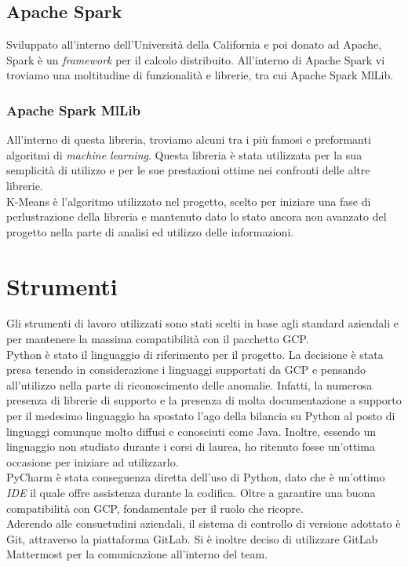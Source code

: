 \subsection{Apache Spark}
Sviluppato all'interno dell'Università della California e poi donato ad Apache, Spark è un \emph{framework} per il calcolo distribuito. 
All'interno di Apache Spark vi troviamo una moltitudine di funzionalità e librerie, tra cui Apache Spark MlLib.
\subsubsection{Apache Spark MlLib}
All'interno di questa libreria, troviamo alcuni tra i più famosi e preformanti algoritmi di \emph{machine learning}. Questa libreria è stata utilizzata per la sua semplicità di utilizzo e per le sue prestazioni ottime nei confronti delle altre librerie.
\\
K-Means \cite{k-means} è  l'algoritmo utilizzato nel progetto, scelto per iniziare una fase di perlustrazione della libreria e mantenuto dato lo stato ancora non avanzato del progetto nella parte di analisi ed utilizzo delle informazioni.
\section{Strumenti}
Gli strumenti di lavoro utilizzati sono stati scelti in base agli standard aziendali e per mantenere la massima compatibilità con il pacchetto GCP.
\\
Python è stato il linguaggio di riferimento per il progetto. La decisione è stata presa tenendo in considerazione i linguaggi supportati da GCP e pensando all'utilizzo nella parte di riconoscimento delle anomalie. Infatti, la numerosa presenza di librerie di supporto e la presenza di molta documentazione a supporto per il medesimo linguaggio ha spostato l'ago della bilancia su Python al posto di linguaggi comunque molto diffusi e conosciuti come Java. Inoltre, essendo un linguaggio non studiato durante i corsi di laurea, ho ritenuto fosse un'ottima occasione per iniziare ad utilizzarlo.
\\
PyCharm è stata conseguenza diretta dell'uso di Python, dato che è un'ottimo \emph{IDE} il quale offre assistenza durante la codifica. Oltre a garantire una buona compatibilità con GCP, fondamentale per il ruolo che ricopre.
\\
Aderendo alle consuetudini aziendali, il sistema di controllo di versione adottato è Git, attraverso la piattaforma GitLab. Si è inoltre deciso di utilizzare GitLab Mattermost per la comunicazione all'interno del team.

